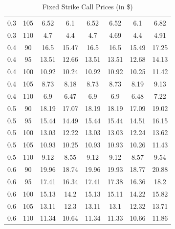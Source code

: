 \documentclass{article}
\begin{document}
\begin{table}[H]
\begin{tabular}{|c|c|c|c|c|c|c|c|}
  0.3 & 105 & 6.52 & 6.1 & 6.52 & 6.52 & 6.1 & 6.82 \\
  0.3 & 110 & 4.7 & 4.4 & 4.7 & 4.69 & 4.4 & 4.91 \\
  0.4 & 90 & 16.5 & 15.47 & 16.5 & 16.5 & 15.49 & 17.25 \\
  0.4 & 95 & 13.51 & 12.66 & 13.51 & 13.51 & 12.68 & 14.13 \\
  0.4 & 100 & 10.92 & 10.24 & 10.92 & 10.92 & 10.25 & 11.42 \\
  0.4 & 105 & 8.73 & 8.18 & 8.73 & 8.73 & 8.19 & 9.13 \\
  0.4 & 110 & 6.9 & 6.47 & 6.9 & 6.9 & 6.48 & 7.22 \\
  0.5 & 90 & 18.19 & 17.07 & 18.19 & 18.19 & 17.09 & 19.02 \\
  0.5 & 95 & 15.44 & 14.49 & 15.44 & 15.44 & 14.51 & 16.15 \\
  0.5 & 100 & 13.03 & 12.22 & 13.03 & 13.03 & 12.24 & 13.62 \\
  0.5 & 105 & 10.93 & 10.25 & 10.93 & 10.93 & 10.26 & 11.43 \\
  0.5 & 110 & 9.12 & 8.55 & 9.12 & 9.12 & 8.57 & 9.54 \\
  0.6 & 90 & 19.96 & 18.74 & 19.96 & 19.93 & 18.77 & 20.88 \\
  0.6 & 95 & 17.41 & 16.34 & 17.41 & 17.38 & 16.36 & 18.2 \\
  0.6 & 100 & 15.13 & 14.2 & 15.13 & 15.11 & 14.22 & 15.82 \\
  0.6 & 105 & 13.11 & 12.3 & 13.11 & 13.1 & 12.32 & 13.71 \\
  0.6 & 110 & 11.34 & 10.64 & 11.34 & 11.33 & 10.66 & 11.86 \\
  \hline
  \end{tabular}
  \caption{Fixed Strike Call Prices (in \$)}
  \label{table:name}
\end{table}
\end{document}
